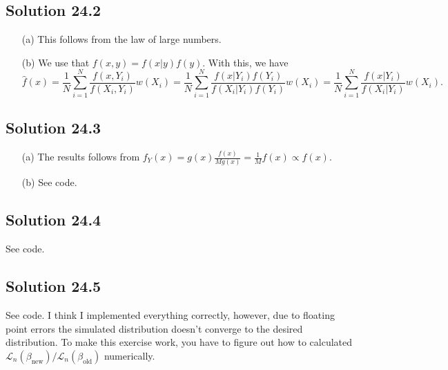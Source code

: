 \subsection*{Solution 24.2}

\begin{itemize}
    \item[(a)] This follows from the law of large numbers.
    \item[(b)] We use that $f(x, y) = f(x|y) f(y)$.
        With this, we have
        \begin{equation*}
            \hat{f}(x) = \frac{1}{N} \sum_{i = 1}^N \frac{f(x, Y_i)}{f(X_i, Y_i)} w(X_i)
                = \frac{1}{N} \sum_{i = 1}^N \frac{f(x|Y_i) f(Y_i)}{f(X_i|Y_i) f(Y_i)} w(X_i)
                = \frac{1}{N} \sum_{i = 1}^N \frac{f(x|Y_i)}{f(X_i|Y_i)} w(X_i).
        \end{equation*}
\end{itemize}


\subsection*{Solution 24.3}

\begin{itemize}
    \item[(a)] The results follows from $f_Y(x) = g(x) \frac{f(x)}{M g(x)} = \frac{1}{M} f(x) \propto f(x)$.
    \item[(b)] See code.
\end{itemize}


\subsection*{Solution 24.4}

See code.


\subsection*{Solution 24.5}

See code.
I think I implemented everything correctly, however, due to floating point errors the simulated distribution doesn't converge to the desired distribution.
To make this exercise work, you have to figure out how to calculated $\mathcal{L}_n(\beta_{\textrm{new}}) / \mathcal{L}_n(\beta_{\textrm{old}})$ numerically.
